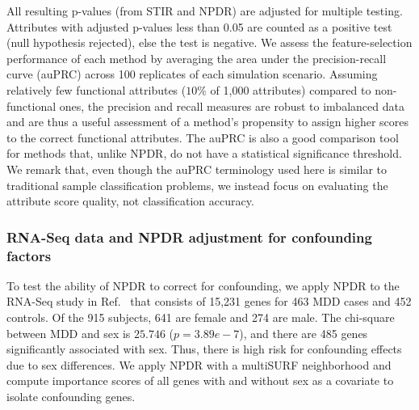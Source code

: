 \documentclass[10pt]{article}
\begin{document}
All resulting p-values (from STIR and NPDR) are adjusted for multiple testing.
Attributes with adjusted p-values less than 0.05 are counted as a positive test (null hypothesis rejected), else the test is negative.
We assess the feature-selection performance of each method by averaging the area under the precision-recall curve (auPRC) across 100 replicates of each simulation scenario.
Assuming relatively few functional attributes ($10\%$ of 1,000 attributes) compared to non-functional ones, the precision and recall measures are robust to imbalanced data and are thus a useful assessment of a method's propensity to assign higher scores to the correct functional attributes. The auPRC is also a good comparison tool for methods that, unlike NPDR, do not have a statistical significance threshold. We remark that, even though the auPRC terminology used here is similar to traditional sample classification problems, we instead focus on evaluating the attribute score quality, not classification accuracy.

\subsubsection{RNA-Seq data and NPDR adjustment for confounding factors}
To test the ability of NPDR to correct for confounding, we apply NPDR to the RNA-Seq study in Ref.~\cite{mostafavi14} that consists of 15,231 genes for 463 MDD cases and 452 controls.
Of the 915 subjects, 641 are female and 274 are male.
The chi-square between MDD and sex is $25.746$ ($p=3.89e-7$), and there are 485 genes significantly associated with sex.
Thus, there is high risk for confounding effects due to sex differences.
We apply NPDR with a multiSURF neighborhood and compute importance scores of all genes with and without sex as a covariate to isolate confounding genes. 
\end{document}
